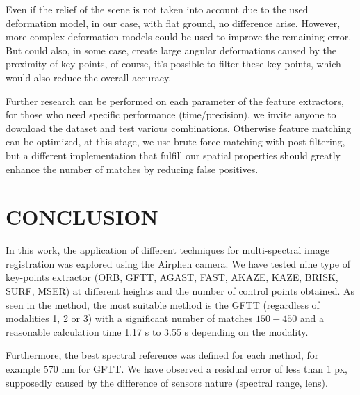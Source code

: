 \documentclass[a4paper,twoside]{article}
\begin{document}
	\par Even if the relief of the scene is not taken into account due to the used deformation model,
	in our case, with flat ground, no difference arise.
	However, more complex deformation models  \cite{ThinPlateSpline} %
	could be used to improve the remaining error.
	But could also, in some case, create large angular deformations caused by the proximity of key-points,
	of course, it's possible to filter these key-points, which would also reduce the overall accuracy.
	\\
	\par Further research can be performed on each parameter of the feature extractors, for those who need specific performance (time/precision),
	we invite anyone to download the dataset and test various combinations.
	Otherwise feature matching can be optimized, at this stage, we use brute-force matching with post filtering,
	but a different implementation that fulfill our spatial properties should greatly enhance the number of matches by reducing false positives.
	
	
	\section{\uppercase{Conclusion}}
	\label{sec:conclusion}
	
	\par In this work, the application of different techniques for multi-spectral image registration was explored using the Airphen camera.
	We have tested nine type of key-points extractor (ORB, GFTT, AGAST, FAST, AKAZE, KAZE, BRISK, SURF, MSER)
	at different heights and the number of control points obtained.
	As seen in the method, the most suitable method is the GFTT (regardless of modalities 1, 2 or 3)
	with a significant number of matches $150-450$ and a reasonable calculation time 1.17 s to 3.55 s depending on the modality.
	\\
	\par Furthermore, the best spectral reference was defined for each method, for example 570 nm for GFTT.
	We have observed a residual error of less than 1 px, supposedly caused by the difference of sensors nature (spectral range, lens).
	
\end{document}
